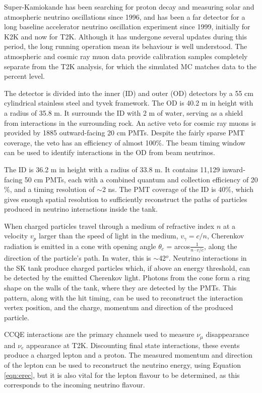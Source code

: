 Super-Kamiokande has been searching for proton decay and measuring solar and atmospheric neutrino oscillations since 1996, and has been a far detector for a long baseline accelerator neutrino oscillation experiment since 1999, initially for K2K and now for T2K. Although it has undergone several updates during this period, the long running operation mean its behaviour is well understood. The atmospheric and cosmic ray muon data provide calibration samples completely separate from the T2K analysis, for which the simulated MC matches data to the percent level.

The detector is divided into the inner (ID) and outer (OD) detectors by a 55 cm cylindrical stainless steel and tyvek framework. The OD is 40.2 m in height with a radius of 35.8 m. It surrounds the ID with 2 m of water, serving as a shield from interactions in the surrounding rock. An active veto for cosmic ray muons is provided by 1885 outward-facing 20 cm PMTs. Despite the fairly sparse PMT coverage, the veto has an efficiency of almost 100$\%$. The beam timing window can be used to identify interactions in the OD from beam neutrinos.

The ID is 36.2 m in height with a radius of 33.8 m. It contains 11,129 inward-facing 50 cm PMTs, each with a combined quantum and collection efficiency of 20$\%$, and a timing resolution of $\sim$2 ns. The PMT coverage of the ID is 40$\%$, which gives enough spatial resolution to sufficiently reconstruct the paths of particles produced in neutrino interactions inside the tank.

When charged particles travel through a medium of refractive index $n$ at a velocity $v_p$ larger than the speed of light in the medium, $v_\gamma = c/n$, Cherenkov radiation is emitted in a cone with opening angle $\theta_c$ = arcos$\frac{1}{n\cdot v/c}$, along the direction of the particle's path. In water, this is $\sim$42$^o$. Neutrino interactions in the SK tank produce charged particles which, if above an energy threshold, can be detected by the emitted Cherenkov light. Photons from the cone form a ring shape on the walls of the tank, where they are detected by the PMTs. This pattern, along with the hit timing, can be used to reconstruct the interaction vertex position, and the charge, momentum and direction of the produced particle.

CCQE interactions are the primary channels used to measure $\nu_\mu$ disappearance and $\nu_e$ appearance at T2K. Discounting final state interactions, these events produce a charged lepton and a proton. The measured momentum and direction of the lepton can be used to reconstruct the neutrino energy, using Equation \ref{eqn:erec}, but it is also vital for the lepton flavour to be determined, as this corresponds to the incoming neutrino flavour.


